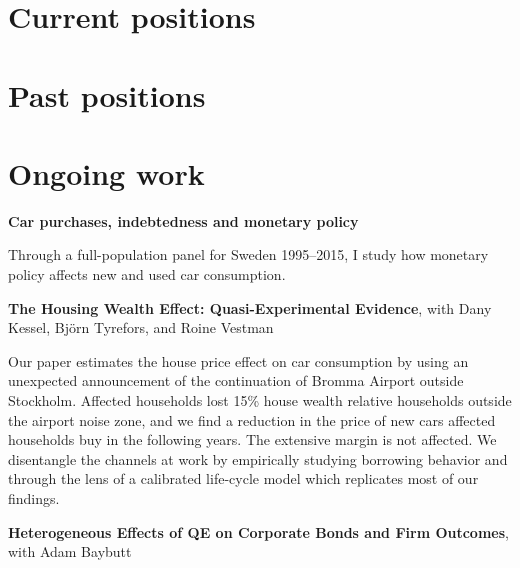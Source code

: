 \documentclass{clean_cv}
\begin{document}
\section{Current positions}

\begin{datetabular}{6em}

\end{datetabular}

\section{Past positions}
\begin{datetabular}{6em}
\end{datetabular}


\section{Ongoing work}

\textbf{Car purchases, indebtedness and monetary policy}

Through a full-population panel for Sweden 1995--2015, I study how monetary policy affects new and used car consumption.

\medskip

\textbf{The Housing Wealth Effect: Quasi-Experimental Evidence}, with Dany Kessel, Björn Tyrefors, and Roine Vestman

Our paper estimates the house price effect on car consumption by using an unexpected announcement of the continuation of Bromma Airport outside Stockholm. Affected households lost 15\% house wealth relative households outside the airport noise zone, and we find a reduction in the price of new cars affected households buy in the following years. The extensive margin is not affected. We disentangle the channels at work by empirically studying borrowing behavior and through the lens of a calibrated life-cycle model which replicates most of our findings.

\medskip

\textbf{Heterogeneous Effects of QE on Corporate Bonds and Firm Outcomes}, with Adam Baybutt
\end{document}

